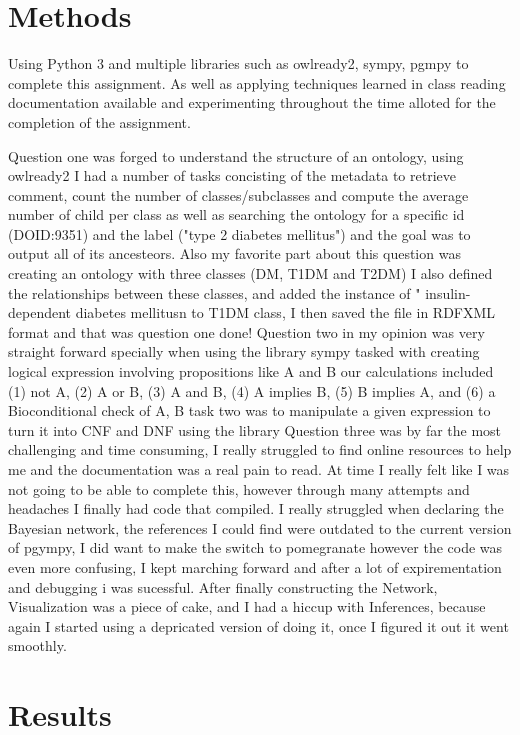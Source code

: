 \documentclass[acmart]{acmart}
\begin{document}
\section{Methods}

Using Python 3 and multiple libraries such as owlready2, sympy, pgmpy to complete this assignment. As well as applying techniques learned in class reading documentation available and experimenting throughout the time alloted for the completion of the assignment.

	Question one was forged to understand the structure of an ontology, using owlready2 I had a number of tasks concisting of  the metadata to retrieve comment, count the number of classes/subclasses and compute the average number of child per class as well as searching the ontology for a specific id (DOID:9351) and the label ("type 2 diabetes mellitus") and the goal was to output all of its ancesteors. Also my favorite part about this question was creating an ontology with three classes (DM, T1DM and T2DM) I also defined the relationships between these classes, and added the instance of " insulin-dependent diabetes mellitusn to T1DM class, I then saved the file in RDFXML format and that was question one done!
	Question two in my opinion was very straight forward specially when using the library sympy tasked with creating logical expression involving propositions like A and B our calculations included (1) not A, (2) A or B, (3) A and B, (4) A implies B, (5) B implies A, and (6) a Bioconditional check of A, B task two was to manipulate a given expression to turn it into CNF and DNF using the library
	Question three was by far the most challenging and time consuming, I really struggled to find online resources to help me and the documentation was a real pain to read. At time I really felt like I was not going to be able to complete this, however through many attempts and headaches I finally had code that compiled. I really struggled when declaring the Bayesian network, the references I could find were outdated to the current version of pgympy, I did want to make the switch to pomegranate however the code was even more confusing, I kept marching forward and after a lot of expirementation and debugging i was sucessful. After finally constructing the Network, Visualization was a piece of cake, and I had a hiccup with Inferences, because again I started using a depricated version of doing it, once I figured it out it went smoothly. 

	

\section{Results}
\end{document}
